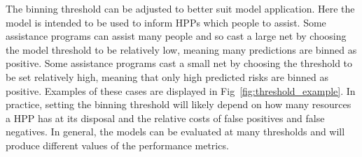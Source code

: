 \documentclass[10pt,letterpaper]{article}
\begin{document}
The binning threshold can be adjusted to better suit model application. Here the model is intended to be used to inform HPPs which people to assist. Some assistance programs can assist many people and so cast a large net by choosing the model threshold to be relatively low, meaning many predictions are binned as positive. Some assistance programs cast a small net by choosing the threshold to be set relatively high, meaning that only high predicted risks are binned as positive. Examples of these cases are displayed in Fig~\ref{fig:threshold_example}. In practice, setting the binning threshold will likely depend on how many resources a HPP has at its disposal and the relative costs of false positives and false negatives. In general, the models can be evaluated at many thresholds and will produce different values of the performance metrics.
\end{document}
